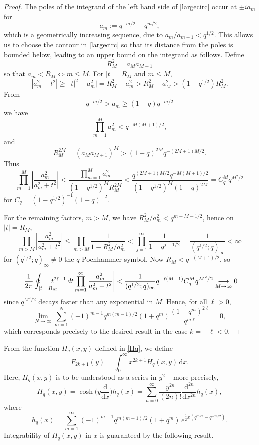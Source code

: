 \documentclass[a4paper]{article}
\theoremstyle{plain}
\theoremstyle{definition}
\newcommand{\dd}{\mathrm{d}}
\renewcommand{\leq}{\leqslant}
\renewcommand{\geq}{\geqslant}
\begin{document}
\begin{proof}


The poles of the integrand of the left hand side of \cref{largecirc} occur at $\pm ia_m$ for
\[a_m:=q^{-m/2}-q^{m/2},\] 
which is a geometrically increasing sequence, due to $a_m/a_{m+1}<q^{1/2}$.  
This allows us to choose the contour in \cref{largecirc} so that its distance from the poles is bounded below, leading to an upper bound on the integrand as follows.   Define 
\[R_M^2=a_Ma_{M+1}\]
so that $a_m<R_M\Leftrightarrow m\leq M$.    
For $|t|=R_M$ and $m\leq M$,
\[
|a_m^2+t^2|
\geq \bigl||t|^2-a_m^2\bigr|
=R_M^2-a_m^2>R_M^2-a_M^2>(1-q^{1/2})R_M^2.
\]
From
\[
q^{-m/2}>a_m\geq (1-q)q^{-m/2}
\]
we have
\[
\prod_{m=1}^M a_m^2
< q^{-M(M+1)/2},
\]
and
\[
R_M^{2M}
=(a_Ma_{M+1})^M
>
(1-q)^{2M}q^{-(2M+1)M/2}.
\]
Thus
\[
\prod_{m=1}^M
\left|
\frac{a_m^2}{a_m^2+t^2}
\right|
<\frac{\prod_{m=1}^M a_m^2}{(1-q^{1/2})^{M}R_M^{2M}}
<\frac{q^{(2M+1)M/2}q^{-M(M+1)/2}}{(1-q^{1/2})^{M}(1-q)^{2M}}=C_q^{M} q^{M^2/2}
\]
for $C_q=(1-q^{1/2})^{-1}(1-q)^{-2}$.




For the remaining factors, $m>M$, we have $R^2_M/a_m^2<q^{m-M-1/2}$, hence on $|t|=R_M$, 
\[
\prod_{m>M}
\left|
\frac{a_m^2}{a_m^2+t^2}
\right|
\leq
\prod_{m>M}\frac{1}{1-R_M^2/a_m^2}
<\prod_{j=1}^\infty\frac{1}{1-q^{j-1/2}}=\frac{1}{(q^{1/2};q)_\infty}<\infty
\]
for $(q^{1/2};q)_\infty\neq0$ the $q$-Pochhammer symbol. 
Now $R_M<q^{-(M+1)/2}$, so
\[
\left|
\frac{1}{2\pi}\oint_{|t|=R_M}
\hspace{-4mm}t^{2\ell -1}\,dt
\prod_{m=1}^\infty
\frac{a_m^2}{a_m^2+t^2}
\right|
<\frac{1}{(q^{1/2};q)_\infty}q^{-\ell (M+1)}C_q^M q^{M^2/2}\underset{M\to\infty}{\longrightarrow}0
\]
since $q^{M^2/2}$ decays faster than any exponential in $M$.  
Hence, for all $\ell >0$,
\[
\lim_{N\to\infty} \sum_{m=1}^N (-1)^{m-1} q^{m(m-1)/2} (1+q^m) \frac{(1-q^m)^{2\ell }}{q^{m\ell }} = 0,
\]
which corresponds precisely to the desired result in the case $k=-\ell<0$.
\end{proof}

From the function $H_q(x,y)$ defined in \cref{Hq}, we define
\[
F_{2k+1}(y)=\int_0^\infty \!\! x^{2k+1} H_q(x,y) \, \dd x.
\]
Here, $H_q(x,y)$ is to be understood as a series in $y^2$ -- more precisely,
\[
H_q(x,y) = \cosh \Big(y\frac{\dd}{\dd x} \Big) h_q(x) = \sum_{n=0}^\infty \frac{y^{2n}}{(2n)!} \frac{\dd^{2n}}{\dd x^{2n}} h_q(x),
\]
where 
\[
h_q(x) = \sum_{m=1}^\infty(-1)^{m-1}q^{m(m-1)/2}(1+q^m) \, e^{\frac{1}{2} x (q^{m/2}-q^{-m/2})}.
\]
Integrability of $H_q(x,y)$ in $x$ is guaranteed by the following result.
\end{document}
